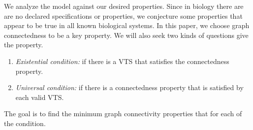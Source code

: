 We analyze the model against our desired properties.
%
Since in biology there are are no declared specifications or properties,
we conjecture some properties that appear to be true in all known
biological systems.
%
In this paper, we choose graph connectedness to be a key property.
%
We will also seek two kinds of questions give the property.


\begin{enumerate}
\item {\em Existential condition:}
if there is a VTS that satisfies the connectedness property. 

\item {\em Universal condition:}
  if there is a connectedness property that is satisfied by each valid VTS.
\end{enumerate}

The goal is to find the minimum graph connectivity properties that for each of the condition.



